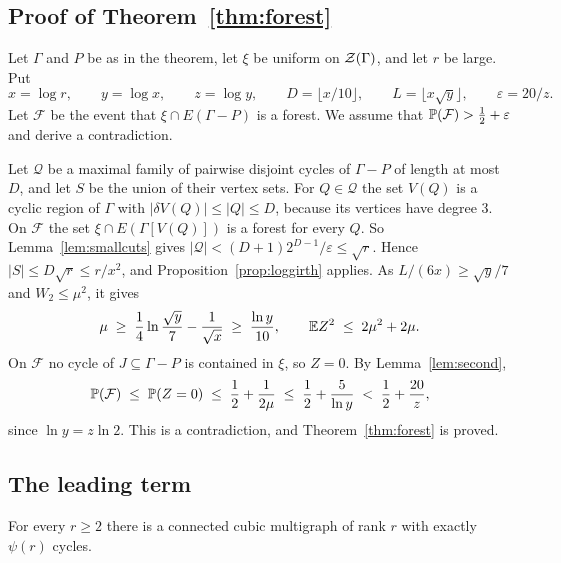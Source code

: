 \subsection{Proof of Theorem~\ref{thm:forest}}

Let $\Gamma$ and $P$ be as in the theorem, let $\xi$ be uniform on $\mathcal{Z}(\Gamma)$, and let $r$ be
large. Put
\[
  x=\log r,\qquad y=\log x,\qquad z=\log y,\qquad
  D=\lfloor x/10\rfloor,\qquad L=\lfloor x\sqrt y\rfloor,\qquad\varepsilon=20/z .
\]
Let $\mathcal{F}$ be the event that $\xi\cap E(\Gamma-P)$ is a forest. We assume that
$\mathbb{P}(\mathcal{F})>\frac12+\varepsilon$ and derive a contradiction.

Let $\mathcal{Q}$ be a maximal family of pairwise disjoint cycles of $\Gamma-P$ of length at most
$D$, and let $S$ be the union of their vertex sets. For $Q\in\mathcal{Q}$ the set $V(Q)$ is a
cyclic region of $\Gamma$ with $|\delta V(Q)|\le|Q|\le D$, because its vertices have degree $3$.
On $\mathcal{F}$ the set $\xi\cap E(\Gamma[V(Q)])$ is a forest for every $Q$. So
Lemma~\ref{lem:smallcuts} gives $|\mathcal{Q}|<(D+1)2^{D-1}/\varepsilon\le\sqrt r$. Hence
$|S|\le D\sqrt r\le r/x^{2}$, and Proposition~\ref{prop:loggirth} applies. As
$L/(6x)\ge\sqrt y/7$ and $W_2\le\mu^{2}$, it gives
\[
  \mu\;\ge\;\frac14\ln\frac{\sqrt y}{7}-\frac1{\sqrt x}\;\ge\;\frac{\ln y}{10},
  \qquad \mathbb{E} Z^{2}\;\le\;2\mu^{2}+2\mu .
\]
On $\mathcal{F}$ no cycle of $J\subseteq\Gamma-P$ is contained in $\xi$, so $Z=0$. By
Lemma~\ref{lem:second},
\[
  \mathbb{P}(\mathcal{F})\;\le\;\mathbb{P}(Z=0)\;\le\;\frac12+\frac1{2\mu}\;\le\;\frac12+\frac{5}{\ln y}
  \;<\;\frac12+\frac{20}{z},
\]
since $\ln y=z\ln2$. This is a contradiction, and Theorem~\ref{thm:forest} is proved.

\subsection{The leading term}\label{sec:leading}

\begin{lemma}\label{lem:cubic}
For every $r\ge2$ there is a connected cubic multigraph of rank $r$ with exactly $\psi(r)$ cycles.
\end{lemma}

